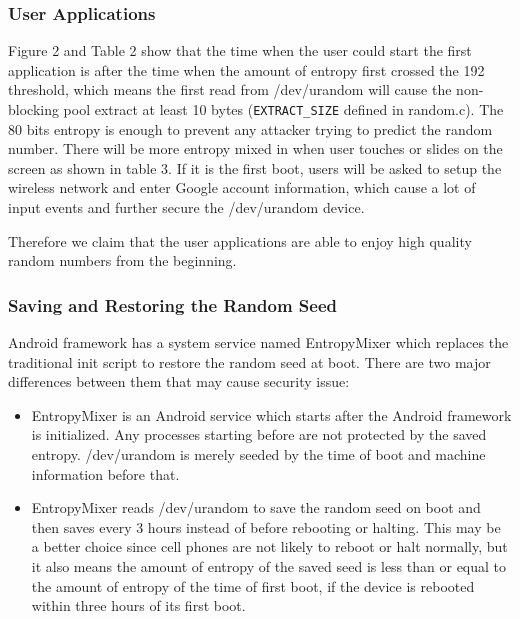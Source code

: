 \subsubsection{User Applications}

Figure 2 and Table 2 show that the time when the user could start the first application is after the time when the amount of entropy first crossed the 192 threshold, which means the first read from /dev/urandom will cause the non-blocking pool extract at least 10 bytes (\verb|EXTRACT_SIZE| defined in random.c). The 80 bits entropy is enough to prevent any attacker trying to predict the random number. There will be more entropy mixed in when user touches or slides on the screen as shown in table 3. If it is the first boot, users will be asked to setup the wireless network and enter Google account information, which cause a lot of input events and further secure the /dev/urandom device. 

Therefore we claim that the user applications are able to enjoy high quality random numbers from the beginning.

\subsubsection{Saving and Restoring the Random Seed}

Android framework has a system service named EntropyMixer which replaces the traditional init script to restore the random seed at boot. There are two major differences between them that may cause security issue:

\begin{itemize}

\item EntropyMixer is an Android service which starts after the Android framework is initialized. Any processes starting before are not protected by the saved entropy. /dev/urandom is merely seeded by the time of boot and machine information before that.

\item EntropyMixer reads /dev/urandom to save the random seed on boot and then saves every 3 hours instead of before rebooting or halting. This may be a better choice since cell phones are not likely to reboot or halt normally, but it also means the amount of entropy of the saved seed is less than or equal to the amount of entropy of the time of first boot, if the device is rebooted within three hours of its first boot. 

\end{itemize}

